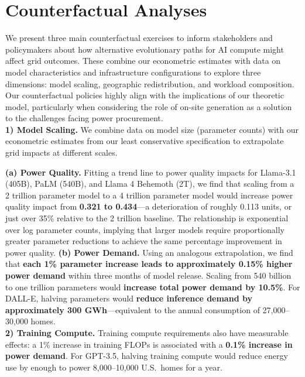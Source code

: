 \documentclass[a4paper,fleqn,longmktitle]{cas-sc}
\begin{document}

\section{Counterfactual Analyses}
\label{sec:counterfactuals}

We present three main counterfactual exercises to inform stakeholders and policymakers about how alternative evolutionary paths for AI compute might affect grid outcomes. These combine our econometric estimates with data on model characteristics and infrastructure configurations to explore three dimensions: model scaling, geographic redistribution, and workload composition. Our counterfactual policies highly align with the implications of our theoretic model, particularly when considering the role of on-site generation as a solution to the challenges facing power procurement.\\

\noindent\textbf{1) Model Scaling.} We combine data on model size (parameter counts) with our econometric estimates from our least conservative specification to extrapolate grid impacts at different scales.

\noindent\textbf{(a) Power Quality.} Fitting a trend line to power quality impacts for Llama-3.1 (405B), PaLM (540B), and Llama 4 Behemoth (2T), we find that scaling from a 2 trillion parameter model to a 4 trillion parameter model would increase power quality impact from \textbf{0.321 to 0.434}---a deterioration of roughly 0.113 units, or just over 35\% relative to the 2 trillion baseline. The relationship is exponential over log parameter counts, implying that larger models require proportionally greater parameter reductions to achieve the same percentage improvement in power quality. \textbf{(b) Power Demand.} Using an analogous extrapolation, we find that \textbf{each 1\% parameter increase leads to approximately 0.15\% higher power demand} within three months of model release. Scaling from 540 billion to one trillion parameters would \textbf{increase total power demand by 10.5\%}. For DALL-E, halving parameters would \textbf{reduce inference demand by approximately 300 GWh}---equivalent to the annual consumption of 27,000--30,000 homes.\\

\noindent\textbf{2) Training Compute.} Training compute requirements also have measurable effects: a 1\% increase in training FLOPs is associated with a \textbf{0.1\% increase in power demand}. For GPT-3.5, halving training compute would reduce energy use by enough to power 8,000--10,000 U.S.\ homes for a year.\\
\end{document}
